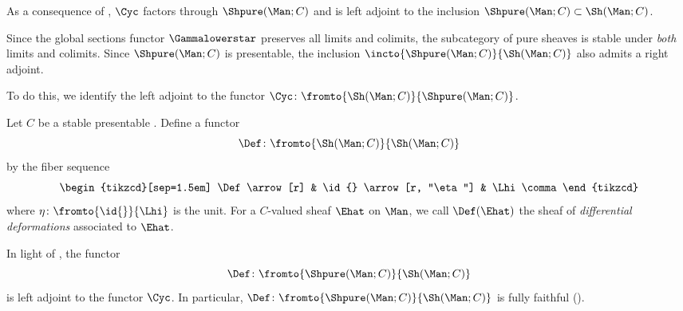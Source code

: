 \begin{nul}
	As a consequence of , $ \Cyc $ factors through $ \Shpure(\Man;C) $ and is left adjoint to the inclusion $ \Shpure(\Man;C) \subset \Sh(\Man;C) $.
\end{nul}

\begin{observation}
	Since the global sections functor $ \Gammalowerstar $ preserves all limits and colimits, the subcategory of pure sheaves is stable under \textit{both} limits and colimits.
	Since $ \Shpure(\Man;C) $ is presentable, the inclusion $ \incto{\Shpure(\Man;C)}{\Sh(\Man;C)} $ also admits a right adjoint.
\end{observation}

To do this, we identify the left adjoint to the functor $ \Cyc \colon \fromto{\Sh(\Man;C)}{\Shpure(\Man;C)} $.

\begin{definition}
	Let $ C $ be a stable presentable \category.
	Define a functor
	\begin{equation*}
		\Def \colon \fromto{\Sh(\Man;C)}{\Sh(\Man;C)}
	\end{equation*}
	by the fiber sequence
	\begin{equation*}
		\begin{tikzcd}[sep=1.5em]
			\Def \arrow[r] & \id{} \arrow[r, "\eta"] & \Lhi \comma
		\end{tikzcd}
	\end{equation*} 
	where $ \eta \colon \fromto{\id{}}{\Lhi} $ is the unit.
	For a $ C $-valued sheaf $ \Ehat $ on $ \Man $, we call $ \Def(\Ehat) $ the sheaf of \textit{differential deformations} associated to $ \Ehat $.
\end{definition}

\begin{observations}\label{obs:Acomposite}
	In light of , the functor 
	\begin{equation*}
		\Def \colon \fromto{\Shpure(\Man;C)}{\Sh(\Man;C)}
	\end{equation*}
	is left adjoint to the functor $ \Cyc $.
	In particular, $ \Def \colon \fromto{\Shpure(\Man;C)}{\Sh(\Man;C)} $ is fully faithful ().

\end{observations}

